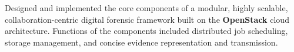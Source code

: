 {\begin{rExperienceBullets}{\PositionTitle}{\PositionPeriod}{\OrgName}
        \item Designed and implemented the core components of a modular, highly scalable, collaboration-centric digital forensic framework built on the \textbf{OpenStack} cloud architecture. Functions of the components included distributed job scheduling, storage management, and concise evidence representation and transmission.



  \end{rExperienceBullets}

}
